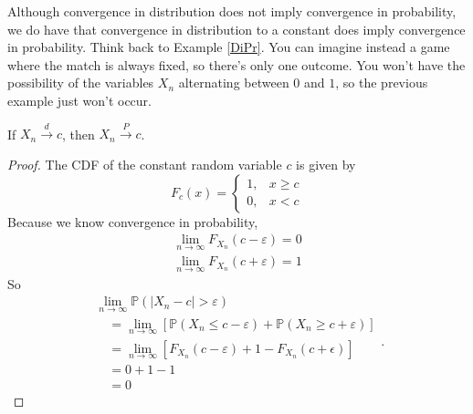 \documentclass{ximera}
\begin{document}
Although convergence in distribution does not imply convergence in probability, we do have that convergence in distribution to a constant does imply convergence in probability. Think back to Example \ref{DiPr}. You can imagine instead a game where the match is always fixed, so there's only one outcome. You won't have the possibility of the variables $X_n$ alternating between $0$ and $1$, so the previous example just won't occur. 

\begin{proposition}
If $X_n \stackrel{d}{\rightarrow} c$, then $X_n \stackrel{P}{\rightarrow} c$. 
\end{proposition}
\begin{proof}
The CDF of the constant random variable $c$ is given by 
$$
F_{c}(x)=\left\{\begin{array}{ll}{1,} & {x \geqslant c} \\ {0,} & {x<c}\end{array}\right.
$$
Because we know convergence in probability, 
$$
\begin{array}{l}{\lim _{n \rightarrow \infty} F_{X_{n}}(c-\varepsilon)=0} \\ {\lim _{n \rightarrow \infty} F_{X_{n}}(c+\varepsilon)=1}\end{array}
$$
So
$$
\begin{array}{l}{\lim _{n \rightarrow \infty} \mathbb{P}\left(\left|X_{n}-c\right|>\varepsilon\right)} \\ {\quad=\lim _{n \rightarrow \infty}\left[\mathbb{P}\left(X_{n} \leqslant c-\varepsilon\right)+\mathbb{P}\left(X_{n} \geqslant c+\varepsilon\right)\right]} \\ {\quad=\lim _{n \rightarrow \infty}\left[F_{X_{n}}(c-\varepsilon)+1-F_{X_{n}}(c+\epsilon)\right]} \\ {\quad=0+1-1} \\ {\quad=0}\end{array}.
$$
\end{proof}
\end{document}
